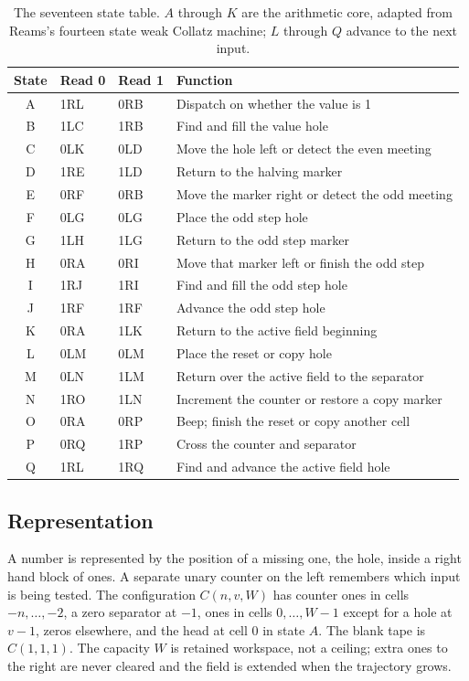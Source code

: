 \begin{table}[t]
\centering\footnotesize
\begin{tabular}{clll}
\toprule
State & Read 0 & Read 1 & Function \\
\midrule
A & 1RL & 0RB & Dispatch on whether the value is 1 \\
B & 1LC & 1RB & Find and fill the value hole \\
C & 0LK & 0LD & Move the hole left or detect the even meeting \\
D & 1RE & 1LD & Return to the halving marker \\
E & 0RF & 0RB & Move the marker right or detect the odd meeting \\
F & 0LG & 0LG & Place the odd step hole \\
G & 1LH & 1LG & Return to the odd step marker \\
H & 0RA & 0RI & Move that marker left or finish the odd step \\
I & 1RJ & 1RI & Find and fill the odd step hole \\
J & 1RF & 1RF & Advance the odd step hole \\
K & 0RA & 1LK & Return to the active field beginning \\
L & 0LM & 0LM & Place the reset or copy hole \\
M & 0LN & 1LM & Return over the active field to the separator \\
N & 1RO & 1LN & Increment the counter or restore a copy marker \\
O & 0RA & 0RP & Beep; finish the reset or copy another cell \\
P & 0RQ & 1RP & Cross the counter and separator \\
Q & 1RL & 1RQ & Find and advance the active field hole \\
\bottomrule
\end{tabular}
\caption{The seventeen state table. $A$ through $K$ are the arithmetic core, adapted from Reams's fourteen state weak Collatz machine; $L$ through $Q$ advance to the next input.}
\label{tab:ch21:tm}
\end{table}

\subsection{Representation}

A number is represented by the position of a missing one, the hole, inside a right hand block of ones. A separate unary counter on the left remembers which input is being tested. The configuration $C(n,v,W)$ has counter ones in cells $-n,\dots,-2$, a zero separator at $-1$, ones in cells $0,\dots,W-1$ except for a hole at $v-1$, zeros elsewhere, and the head at cell $0$ in state $A$. The blank tape is $C(1,1,1)$. The capacity $W$ is retained workspace, not a ceiling; extra ones to the right are never cleared and the field is extended when the trajectory grows.

